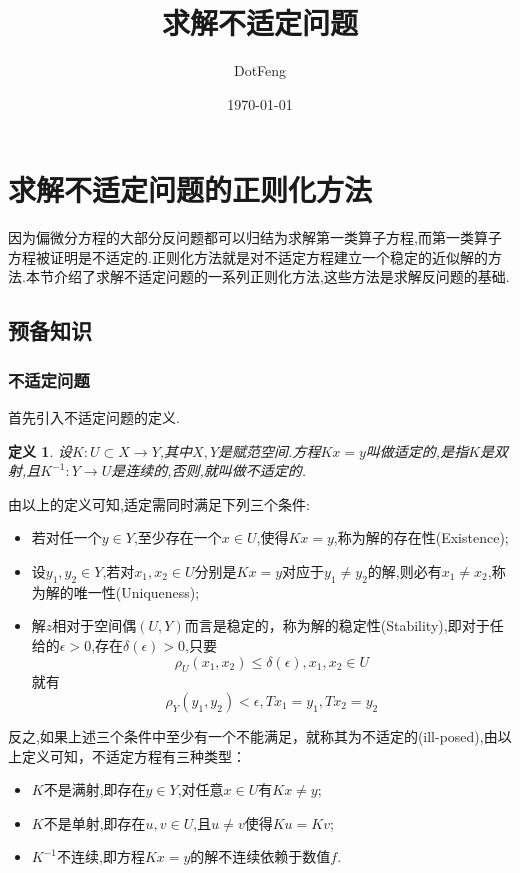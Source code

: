 \documentclass[UTF8]{ctexart}
\title{求解不适定问题}
\author{DotFeng}
\date{\today}
\numberwithin{equation}{section}
\newtheorem{definition}{\hspace{2em}定义}[section]
\begin{document}
\maketitle


\newpage

\tableofcontents

\newpage
\section{求解不适定问题的正则化方法}
因为偏微分方程的大部分反问题都可以归结为求解第一类算子方程,而第一类算子方程被证明是不适定的.正则化方法就是对不适定方程建立一个稳定的近似解的方法.本节介绍了求解不适定问题的一系列正则化方法,这些方法是求解反问题的基础.
\subsection{预备知识}
\subsubsection{不适定问题}
首先引入不适定问题的定义.

\begin{definition}
设$K:U\subset X\to Y$,其中$X,Y$是赋范空间.方程$Kx=y$叫做适定的,是指$K$是双射,且$K^{-1}:Y\to U$是连续的,否则,就叫做不适定的.
\end{definition}

由以上的定义可知,适定需同时满足下列三个条件:
\begin{itemize}
\item 若对任一个$y\in Y$,至少存在一个$x\in U$,使得$Kx=y$,称为解的存在性(Existence);
\item 设$y_{1},y_{2}\in Y$,若对$x_{1},x_{2}\in U$分别是$Kx=y$对应于$y_{1}\ne y_{2}$的解,则必有$x_{1}\ne x_{2}$,称为解的唯一性(Uniqueness);
\item 解$z$相对于空间偶$(U,Y)$而言是稳定的，称为解的稳定性(Stability),即对于任给的$\epsilon > 0$,存在$\delta(\epsilon)>0$,只要
\begin{equation}
\rho_{U}(x_{1},x_{2})\le \delta(\epsilon),x_{1},x_{2}\in U
\end{equation}
就有
\begin{equation}
\rho_{Y}(y_{1},y_{2})< \epsilon,Tx_{1}=y_{1},Tx_{2}=y_{2}
\end{equation}
\end{itemize}


反之,如果上述三个条件中至少有一个不能满足，就称其为不适定的(ill-posed),由以上定义可知，不适定方程有三种类型：
\begin{itemize}
\item $K$不是满射,即存在$y\in Y$,对任意$x\in U$有$Kx\ne y$;
\item $K$不是单射,即存在$u,v\in U$,且$u\ne v$使得$Ku=Kv$;
\item $K^{-1}$不连续,即方程$Kx=y$的解不连续依赖于数值$f$.
\end{itemize}
\end{document}
